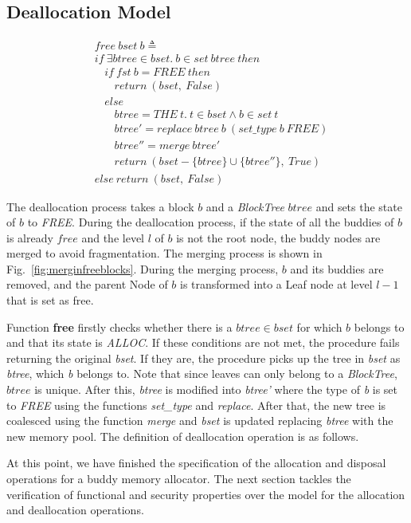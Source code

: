 \subsection{Deallocation Model}

\begin{definition} 
	\begin{align*}
	&free\ bset\ b \triangleq \\
	&if\ \exists btree \in bset.\ b \in set\ btree\ then \\
	&\ \ \ \ if\ fst\ b = FREE\ then \\
	&\ \ \ \ \ \ \ \ return\ (bset,\ False) \\
	&\ \ \ \ else \\
	&\ \ \ \ \ \ \ \ btree = THE\ t.\ t \in bset \wedge b \in set\ t \\
	&\ \ \ \ \ \ \ \ btree' = replace\ btree\ b\ (set\_type\ b\ FREE) \\
	&\ \ \ \ \ \ \ \ btree'' = merge\ btree' \\
	&\ \ \ \ \ \ \ \ return\ (bset - \lbrace btree \rbrace \cup \lbrace btree'' \rbrace,\ True) \\
	&else\ return\ (bset,\ False)
	\end{align*}
\end{definition}

The deallocation process takes a block $b$ and a \emph{BlockTree} $btree$ and sets the state of $b$ to \emph{FREE}. During the deallocation process, if the state of all the buddies of $b$ is already $free$ and the level $l$ of $b$ is not the root node, the buddy nodes are merged to avoid fragmentation. The merging process is shown in Fig.~\ref{fig:merginfreeblocks}. During the merging process, $b$ and its buddies are removed, and the parent Node of $b$ is transformed into a Leaf node at level $l - 1$ that is set as free.



Function \textbf{free} firstly checks whether there is a $btree \in bset$ for which $b$ belongs to and that its state is \emph{ALLOC}. If these conditions are not met, the procedure fails returning the original \emph{bset}. If they are, the procedure picks up the tree in \emph{bset} as \emph{btree}, which \emph{b} belongs to. Note that since leaves can only belong to a \emph{BlockTree}, $btree$ is unique.  After this, \emph{btree} is modified into \emph{btree'} where the type of \emph{b} is set to \emph{FREE} using the functions \emph{set\_type} and \emph{replace}. After that, the new tree is coalesced using the function \emph{merge} and \emph{bset} is updated replacing \emph{btree} with the new memory pool. The definition of deallocation operation is as follows.



At this point, we have finished the specification of the allocation and disposal operations for a buddy memory allocator. The next section tackles the verification of functional and security properties over the model for the allocation and deallocation operations.